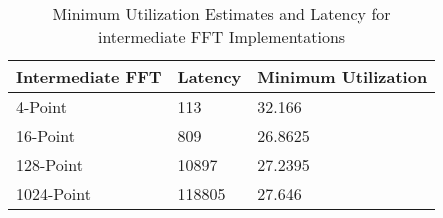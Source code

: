 \begin{table}[!h]
\centering
\caption{Minimum Utilization Estimates and Latency for intermediate FFT Implementations}
\label{min_area}
\begin{tabular}{||m{4cm}|m{2.5cm}|m{2.5cm}||}
\hline
Intermediate FFT & Latency & Minimum Utilization\\
\hline
4-Point&113&32.166\\
\hline
16-Point &809&26.8625\\
\hline
128-Point & 10897&27.2395 \\
\hline
1024-Point & 118805&27.646\\
\hline
\end{tabular}
\end{table}